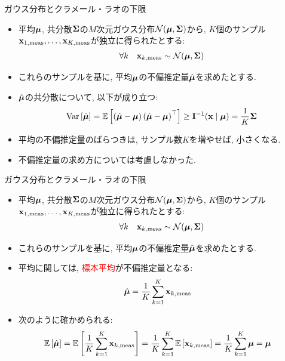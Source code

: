\documentclass[dvipdfmx,notheorems,t]{beamer}
\begin{document}
\begin{frame}{ガウス分布とクラメール・ラオの下限}
\begin{itemize}
  \item 平均$\vb*{\mu}$, 共分散$\vb{\Sigma}$の$M$次元ガウス分布$\mathcal{N}(\vb*{\mu}, \vb{\Sigma})$から,
  $K$個のサンプル$\vb{x}_{1, \mathrm{meas}}, \ldots, \vb{x}_{K, \mathrm{meas}}$が独立に得られたとする:
  \begin{align*}
    \forall k \quad \vb{x}_{k, \mathrm{meas}} \sim \mathcal{N}(\vb*{\mu}, \vb{\Sigma})
  \end{align*}

  \item これらのサンプルを基に, 平均$\vb*{\mu}$の不偏推定量$\hat{\vb*{\mu}}$を求めたとする.
  \item $\hat{\vb*{\mu}}$の共分散について, 以下が成り立つ:
  \begin{align*}
    \operatorname{Var} \left[ \hat{\vb*{\mu}} \right] = \operatorname{\mathbb{E}} \left[ \left( \hat{\vb*{\mu}} - \vb*{\mu} \right)
      \left( \hat{\vb*{\mu}} - \vb*{\mu} \right)^\top \right]
      \ge \vb{I}^{-1}(\vb{x} \mid \vb*{\mu}) = \frac{1}{K} \vb{\Sigma}
  \end{align*}

  \item 平均の不偏推定量のばらつきは, サンプル数$K$を増やせば, 小さくなる.
  \item 不偏推定量の求め方については考慮しなかった.
\end{itemize}
\end{frame}

\begin{frame}{ガウス分布とクラメール・ラオの下限}
\begin{itemize}
  \item 平均$\vb*{\mu}$, 共分散$\vb{\Sigma}$の$M$次元ガウス分布$\mathcal{N}(\vb*{\mu}, \vb{\Sigma})$から,
  $K$個のサンプル$\vb{x}_{1, \mathrm{meas}}, \ldots, \vb{x}_{K, \mathrm{meas}}$が独立に得られたとする:
  \begin{align*}
    \forall k \quad \vb{x}_{k, \mathrm{meas}} \sim \mathcal{N}(\vb*{\mu}, \vb{\Sigma})
  \end{align*}

  \item これらのサンプルを基に, 平均$\vb*{\mu}$の不偏推定量$\hat{\vb*{\mu}}$を求めたとする.
  \item 平均に関しては, \textcolor{red}{標本平均}が不偏推定量となる:
  \begin{align*}
    \hat{\vb*{\mu}} &= \frac{1}{K} \sum_{k = 1}^K \vb{x}_{k, \mathrm{meas}}
  \end{align*}
  \item 次のように確かめられる:
  \begin{align*}
    \operatorname{\mathbb{E}} \left[ \hat{\vb*{\mu}} \right] &= \operatorname{\mathbb{E}} \left[ \frac{1}{K} \sum_{k = 1}^K \vb{x}_{k, \mathrm{meas}} \right]
      = \frac{1}{K} \sum_{k = 1}^K \operatorname{\mathbb{E}} \left[ \vb{x}_{k, \mathrm{meas}} \right]
      = \frac{1}{K} \sum_{k = 1}^K \vb*{\mu} = \vb*{\mu}
  \end{align*}
\end{itemize}
\end{frame}
\end{document}
